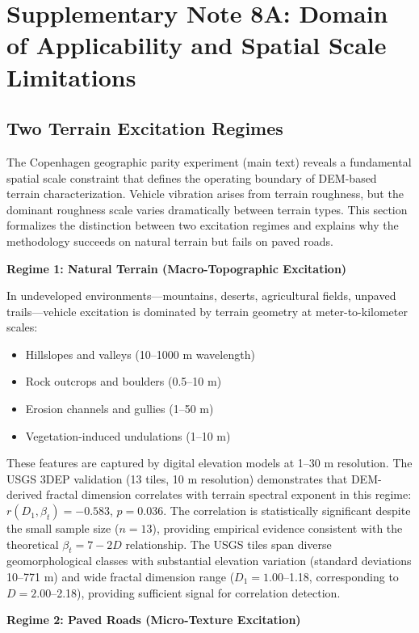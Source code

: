\documentclass[11pt]{article}
\begin{document}
\section{Supplementary Note 8A: Domain of Applicability and Spatial Scale Limitations}

\subsection{Two Terrain Excitation Regimes}

The Copenhagen geographic parity experiment (main text) reveals a fundamental spatial scale constraint that defines the operating boundary of DEM-based terrain characterization. Vehicle vibration arises from terrain roughness, but the dominant roughness scale varies dramatically between terrain types. This section formalizes the distinction between two excitation regimes and explains why the methodology succeeds on natural terrain but fails on paved roads.

\textbf{Regime 1: Natural Terrain (Macro-Topographic Excitation)}

In undeveloped environments---mountains, deserts, agricultural fields, unpaved trails---vehicle excitation is dominated by terrain geometry at meter-to-kilometer scales:
\begin{itemize}
\item Hillslopes and valleys (10--1000 m wavelength)
\item Rock outcrops and boulders (0.5--10 m)
\item Erosion channels and gullies (1--50 m)
\item Vegetation-induced undulations (1--10 m)
\end{itemize}

These features are captured by digital elevation models at 1--30 m resolution. The USGS 3DEP validation (13 tiles, 10 m resolution) demonstrates that DEM-derived fractal dimension correlates with terrain spectral exponent in this regime: $r(D_1, \beta_t) = -0.583$, $p = 0.036$. The correlation is statistically significant despite the small sample size ($n=13$), providing empirical evidence consistent with the theoretical $\beta_t = 7-2D$ relationship. The USGS tiles span diverse geomorphological classes with substantial elevation variation (standard deviations 10--771 m) and wide fractal dimension range ($D_1 = 1.00$--1.18, corresponding to $D = 2.00$--2.18), providing sufficient signal for correlation detection.

\textbf{Regime 2: Paved Roads (Micro-Texture Excitation)}
\end{document}
